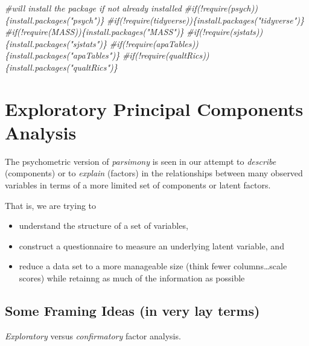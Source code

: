 \documentclass[
  english,
]{book}
\newenvironment{Shaded}{\begin{snugshade}}{\end{snugshade}}
\newcommand{\CommentTok}[1]{\textcolor[rgb]{0.56,0.35,0.01}{\textit{#1}}}
\providecommand{\tightlist}{%
  \setlength{\itemsep}{0pt}\setlength{\parskip}{0pt}}
\begin{document}
\begin{Shaded}
\begin{Highlighting}[]
\CommentTok{#will install the package if not already installed}
\CommentTok{#if(!require(psych))\{install.packages("psych")\}}
\CommentTok{#if(!require(tidyverse))\{install.packages("tidyverse")\}}
\CommentTok{#if(!require(MASS))\{install.packages("MASS")\}}
\CommentTok{#if(!require(sjstats))\{install.packages("sjstats")\}}
\CommentTok{#if(!require(apaTables))\{install.packages("apaTables")\}}
\CommentTok{#if(!require(qualtRics))\{install.packages("qualtRics")\}}
\end{Highlighting}
\end{Shaded}

\hypertarget{exploratory-principal-components-analysis}{%
\section{Exploratory Principal Components Analysis}\label{exploratory-principal-components-analysis}}

The psychometric version of \emph{parsimony} is seen in our attempt to \emph{describe} (components) or to \emph{explain} (factors) in the relationships between many observed variables in terms of a more limited set of components or latent factors.

That is, we are trying to

\begin{itemize}
\tightlist
\item
  understand the structure of a set of variables,
\item
  construct a questionnaire to measure an underlying latent variable, and
\item
  reduce a data set to a more manageable size (think fewer columns\ldots scale scores) while retainng as much of the information as possible
\end{itemize}

\hypertarget{some-framing-ideas-in-very-lay-terms}{%
\subsection{Some Framing Ideas (in very lay terms)}\label{some-framing-ideas-in-very-lay-terms}}

\emph{Exploratory} versus \emph{confirmatory} factor analysis.
\end{document}

